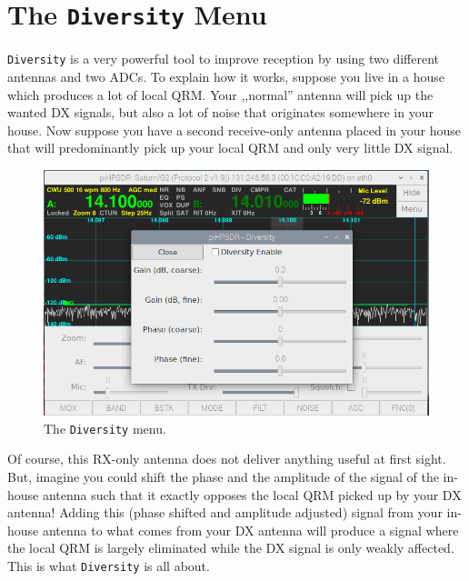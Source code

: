 \documentclass[12pt]{book}
\def\bltt#1{\texttt{\color{blue}#1}}
\begin{document}
\section{The \texttt{Diversity} Menu}

\bltt{Diversity} is a very powerful tool to improve reception by using two different
antennas and two ADCs. To explain how it works, suppose you live in a house which produces
a lot of local QRM. Your ,,normal'' antenna will pick up the wanted DX signals, but also
a lot of noise that originates somewhere in your house. Now suppose you have a second
receive-only antenna placed in your house that will predominantly pick up your local
QRM and only very little DX signal.

\begin{figure}[ht]
\center
\includegraphics[width=12cm]{DiversityMenu.png}
\caption{The \bltt{Diversity} menu.}
\label{fig:DiversityMenu}
\end{figure}

Of course, this RX-only antenna does not deliver anything useful at first sight. But, imagine
you could shift the phase and the amplitude of the signal of the in-house antenna such that it
exactly opposes the local QRM picked up by your DX antenna! Adding this (phase shifted and amplitude
adjusted) signal from your in-house antenna to what comes from your DX antenna will produce
a signal where the local QRM is largely eliminated while the DX signal is only weakly affected.
This is what \bltt{Diversity} is all about.

\end{document}
